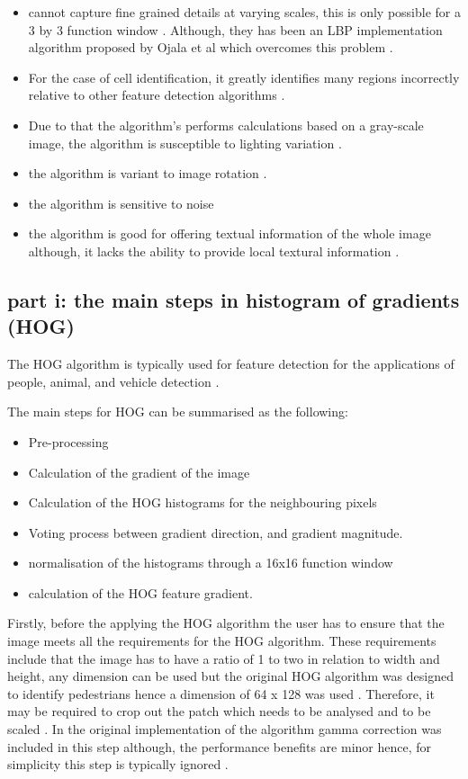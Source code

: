 \documentclass[conference]{IEEEtran}
\begin{document}
\begin{itemize}
	\item cannot capture fine grained details at varying scales, this is only possible for a 3 by 3 function window \cite{b5} \cite{b10}. Although, they has been an LBP implementation algorithm proposed by Ojala et al which overcomes this problem \cite{b5}.
	\item For the case of cell identification, it greatly identifies many regions incorrectly relative to other feature detection algorithms  \cite{b6}.
	\item Due to that the algorithm's performs calculations based on a gray-scale image, the algorithm is susceptible to lighting variation \cite{b9}.
	\item the algorithm is variant to image rotation \cite{b10}.
	\item the algorithm is sensitive to noise \cite{b10}
	\item the algorithm is good for offering textual information of the whole image although, it lacks the ability to provide local textural information \cite{b10}.
	
\end{itemize}

\subsection{part i: the main steps in histogram of gradients (HOG)}


The HOG algorithm is typically used for feature detection for the applications of people, animal, and vehicle detection \cite{b8}.\par

The main steps for HOG can be summarised as the following:

\begin{itemize}
	\item Pre-processing
	\item Calculation of the gradient of the image
	\item Calculation of the HOG histograms for the neighbouring pixels
	\item Voting process between gradient direction, and gradient magnitude.
	\item normalisation of the histograms through a 16x16 function window
	\item calculation of the HOG feature gradient.
\end{itemize}

Firstly, before the applying the HOG algorithm the user has to ensure that the image meets all the requirements for the HOG algorithm. These requirements include that the image has to have a ratio of 1 to two in relation to width and height, any dimension can be used but the original HOG algorithm was designed to identify pedestrians hence a dimension of 64 x 128 was used \cite{b12}. Therefore, it may be required to crop out the patch which needs to be analysed and to be scaled \cite{b12}. In the original implementation of the algorithm gamma correction was included in this step although, the performance benefits are minor hence, for simplicity this step is typically ignored \cite{b12}. \par
\end{document}
